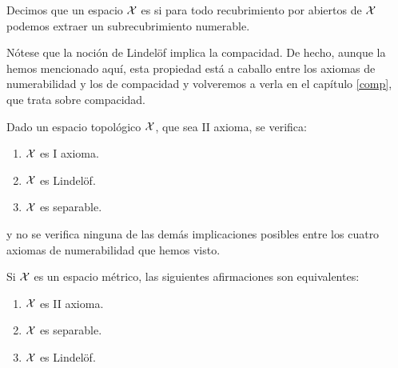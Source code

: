 \begin{defi}[Lindelöf]
	\label{lindel}
	Decimos que un espacio $\mathcal{X}$ es  si para todo recubrimiento por abiertos de $\mathcal{X}$ podemos extraer un subrecubrimiento numerable.
\end{defi}

\begin{obs}
	Nótese que la noción de Lindelöf implica la compacidad. De hecho, aunque la hemos mencionado aquí, esta propiedad está a caballo entre los axiomas de numerabilidad y los de compacidad y volveremos a verla en el capítulo \ref{comp}, que trata sobre compacidad.
\end{obs}

\begin{prop}
	Dado un espacio topológico $\mathcal{X}$, que sea II axioma, se verifica:
	\begin{enumerate}
		\item $\mathcal{X}$ es I axioma.
		\item $\mathcal{X}$ es Lindelöf.
		\item $\mathcal{X}$ es separable.
	\end{enumerate}
	y no se verifica ninguna de las demás implicaciones posibles entre los cuatro axiomas de numerabilidad que hemos visto.
\end{prop}

\begin{obs}
	Si $\mathcal{X}$ es un espacio métrico, las siguientes afirmaciones son equivalentes:
	\begin{enumerate}
		\item $\mathcal{X}$ es II axioma.
		\item $\mathcal{X}$ es separable.
		\item $\mathcal{X}$ es Lindelöf. \qedhere
	\end{enumerate}
\end{obs}

